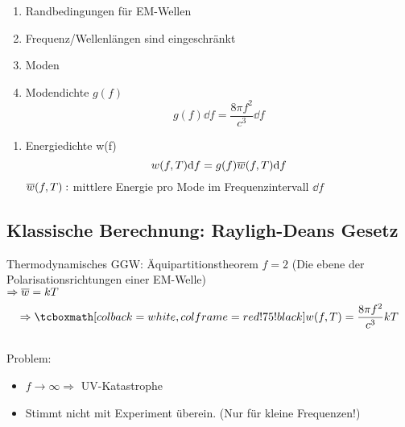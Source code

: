 \begin{minipage}{.6\linewidth}
	\begin{enumerate}[$ \Rightarrow $]
		\item Randbedingungen für EM-Wellen
		\item Frequenz/Wellenlängen sind eingeschränkt
		\item Moden
		\item Modendichte $ g(f) $
		\begin{equation*}
		g(f) \dd f = \frac{ 8 \pi f^2 }{c^3} \dd f
		\end{equation*}
	\end{enumerate}
\end{minipage}%
\begin{minipage}{.4\linewidth}
	\flushright
\end{minipage}%
\begin{enumerate}[$ \Rightarrow $]
	\item Energiedichte w(f)
	\begin{equation*}
	w(f,T) \textrm{d} f = g(f) \overline{w}(f,T) \textrm{d} f
	\end{equation*}
	$ \overline{w}(f,T) : $ mittlere Energie pro Mode im Frequenzintervall $ \dd f $
\end{enumerate}

\subsection{Klassische Berechnung: Rayligh-Deans Gesetz}

Thermodynamisches GGW: Äquipartitionstheorem $ f = 2 $ (Die ebene der Polarisationsrichtungen einer EM-Welle)\\[5pt]
$ \Rightarrow \overline{w} = k T $
\begin{equation*}
\Rightarrow \rmbox{w(f,T) = \frac{8 \pi f^2}{c^3} k T}
\end{equation*}
\\
Problem:
\begin{itemize}
	\item $ f \to \infty \Rightarrow $ UV-Katastrophe
	\item Stimmt nicht mit Experiment überein. (Nur für kleine Frequenzen!)
\end{itemize}

